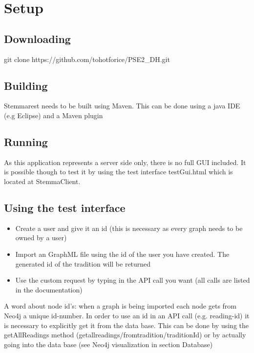 \documentclass[11pt,fleqn,openany]{book} %
\begin{document}
\chapter{Setup}

\section*{Downloading}

git clone https://github.com/tohotforice/PSE2\_DH.git

\section*{Building}

Stemmarest needs to be built using Maven. This can be done using a java IDE (e.g Eclipse) and a Maven plugin

\section*{Running}

As this application represents a server side only, there is no full GUI included. It is possible though to test it by using the test interface testGui.html which is located at StemmaClient.

\section*{Using the test interface}

\begin{itemize}
\item Create a user and give it an id (this is necessary as every graph needs to be owned by a user)
\item Import an GraphML file using the id of the user you have created. The generated id of the tradition will be returned
\item Use the custom request by typing in the API call you want (all calls are listed in the documentation)
\end{itemize}
A word about node id's: when a graph is being imported each node gets from Neo4j a unique id-number. In order to use an id in an API call (e.g. reading-id) it is necessary to explicitly get it from the data base. This can be done by using the getAllReadings method (getallreadings/fromtradition/{traditionId}) or by actually going into the data base (see Neo4j visualization in section Database)

\end{document}
